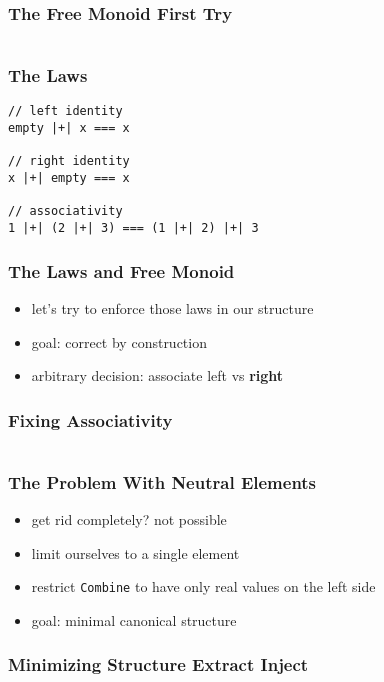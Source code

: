 \documentclass{beamer}
\begin{document}
\begin{frame}
  \frametitle{The Free Monoid \textemdash{} First Try}
  \inputminted{scala}{snippets/free-monoid-1.scala}
\end{frame}

\begin{frame}[fragile]
  \frametitle{The Laws}
  \begin{verbatim}
// left identity
empty |+| x === x

// right identity
x |+| empty === x

// associativity
1 |+| (2 |+| 3) === (1 |+| 2) |+| 3
  \end{verbatim}
\end{frame}

\begin{frame}
  \frametitle{The Laws and Free Monoid}
  \begin{itemize}
  \item let's try to enforce those laws in our structure
  \item goal: correct by construction
  \item arbitrary decision: associate left vs \textbf{right}
  \end{itemize}
\end{frame}

\begin{frame}
  \frametitle{Fixing Associativity}
  \inputminted[highlightlines={11,13,7}, highlightcolor=yellow!40]{scala}{snippets/free-monoid-2.scala}
\end{frame}

\begin{frame}
  \frametitle{The Problem With Neutral Elements}
  \begin{itemize}
  \item get rid completely? not possible
  \item limit ourselves to a single element
  \item restrict \texttt{Combine} to have only real values on the left side
  \item goal: minimal canonical structure
  \end{itemize}
\end{frame}

\begin{frame}
  \frametitle{Minimizing Structure \textemdash{} Extract Inject}
  \inputminted[highlightlines={1, 7}, highlightcolor=yellow!40]{scala}{snippets/free-monoid-3.scala}
\end{frame}
\end{document}
